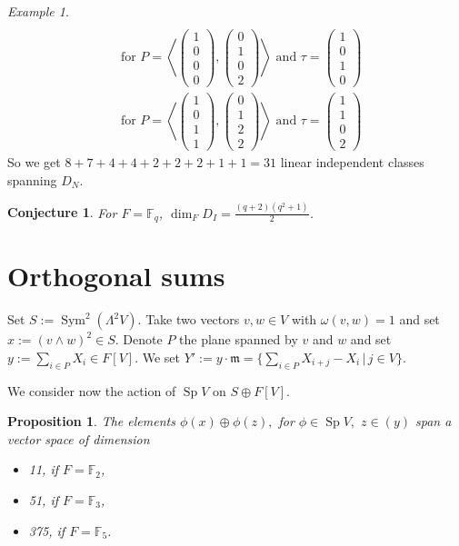 \documentclass{amsart}
\DeclareMathOperator{\Sp}{Sp}
\DeclareMathOperator{\Sym}{Sym}
\newcommand{\vect}[1]{\left( \begin{smallmatrix} #1 \end{smallmatrix} \right)}
\newcommand{\plan}[2]{\left< \vect{ #1 }, \vect{ #2 } \right>}
\theoremstyle{plain}
\newtheorem{proposition}[theorem]{Proposition}
\newtheorem{conjecture}[theorem]{Conjecture}
\theoremstyle{definition}
\theoremstyle{remark}
\newtheorem{example}[theorem]{Example}
\begin{document}
\begin{example}
\begin{align}
\\
&\text{for } P=\plan{1\\0\\0\\0}{0\\1\\0\\2} \text{ and } \tau = \vect{1\\0\\1\\0}
\\
&\text{for } P=\plan{1\\0\\1\\1}{0\\1\\2\\2} \text{ and } \tau = \vect{1\\1\\0\\2}
\end{align}
So we get $8+7+4+4+2+2+2+1+1 = 31$ linear independent classes spanning $D_N$.
\end{example}

\begin{conjecture}
For $F=\mathbb F_q$, $\dim_F D_I = \frac{(q+2)(q^2+1)}{2}$.
\end{conjecture}


\section{Orthogonal sums}
Set $S:=\Sym^2 (\Lambda^2V)$. Take two vectors $v,w\in V$ with $\omega(v,w)=1$ and set $x:= (v\wedge w)^2\in S$. Denote $P$ the plane spanned by $v$ and $w$ and set $y:= \sum_{i\in P}X_i\in  F[V]$.
We set $Y':=y\cdot \mathfrak{m} = \{\sum_{i\in P} X_{i+j}-X_i\,|\, j\in V \} $.

We consider now the action of $\Sp V$ on $S\oplus F[V]$. 
\begin{proposition}
The elements $\phi(x)\oplus \phi(z),$ for $\phi \in \Sp V,$ $z \in (y)$ span a vector space of dimension
\begin{itemize}
\item 11, if $F=\mathbb F_2$,
\item 51, if $F=\mathbb F_3$,
\item 375, if $F=\mathbb F_5$.
\end{itemize}
\end{proposition}
\end{document}
